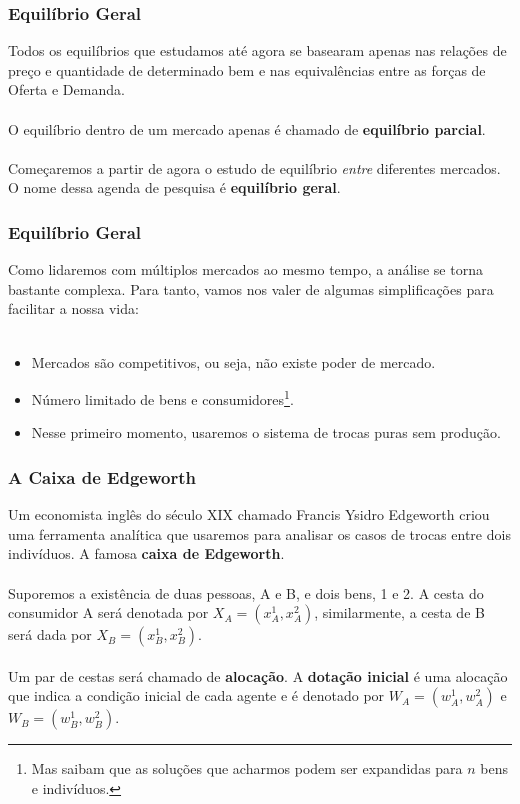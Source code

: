 \documentclass{beamer}[10]
\begin{document}
\begin{frame}
	\frametitle{Equilíbrio Geral}

	Todos os equilíbrios que estudamos até agora se basearam apenas nas relações de preço e quantidade de determinado bem e nas equivalências entre as forças de Oferta e Demanda. 
	\\~\\
	O equilíbrio dentro de um mercado apenas é chamado de \textbf{equilíbrio parcial}.
	\\~\\
	Começaremos a partir de agora o estudo de equilíbrio \textit{entre} diferentes mercados. O nome dessa agenda de pesquisa é \textbf{equilíbrio geral}.

\end{frame}

\begin{frame}
	\frametitle{Equilíbrio Geral}

	Como lidaremos com múltiplos mercados ao mesmo tempo, a análise se torna bastante complexa. Para tanto, vamos nos valer de algumas simplificações para facilitar a nossa vida:
	\\~\\
	\begin{itemize}
		\item Mercados são competitivos, ou seja, não existe poder de mercado.
		\item Número limitado de bens e consumidores\footnote{Mas saibam que as soluções que acharmos podem ser expandidas para $n$ bens e indivíduos.}.
		\item Nesse primeiro momento, usaremos o sistema de trocas puras sem produção.
	\end{itemize}

\end{frame}

\begin{frame}
	\frametitle{A Caixa de Edgeworth}

	Um economista inglês do século XIX chamado Francis Ysidro Edgeworth criou uma ferramenta analítica que usaremos para analisar os casos de trocas entre dois indivíduos. A famosa \textbf{caixa de Edgeworth}.
	\\~\\
	Suporemos a existência de duas pessoas, A e B, e dois bens, 1 e 2. A cesta do consumidor A será denotada por $X_A = (x_A^1, x_A^2)$, similarmente, a cesta de B será dada por $X_B = (x_B^1, x_B^2)$. 
	\\~\\
	Um par de cestas será chamado de \textbf{alocação}. A \textbf{dotação inicial} é uma alocação que indica a condição inicial de cada agente e é denotado por $W_A = (w_A^1,w_A^2)$ e $W_B = (w_B^1,w_B^2)$.

\end{frame}
\end{document}
